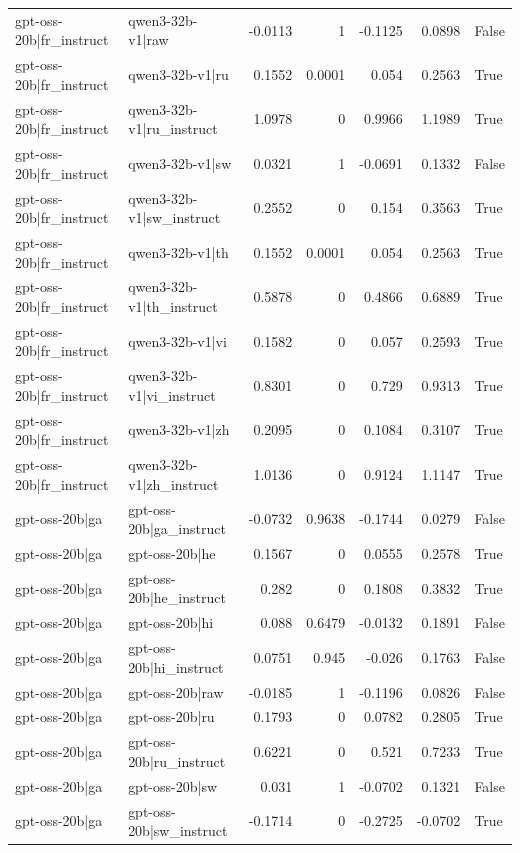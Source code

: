 \begin{table}
\begin{tabular}{l l r r r r l}
gpt-oss-20b|fr_instruct & qwen3-32b-v1|raw & -0.0113 & 1 & -0.1125 & 0.0898 & False \\
gpt-oss-20b|fr_instruct & qwen3-32b-v1|ru & 0.1552 & 0.0001 & 0.054 & 0.2563 & True \\
gpt-oss-20b|fr_instruct & qwen3-32b-v1|ru_instruct & 1.0978 & 0 & 0.9966 & 1.1989 & True \\
gpt-oss-20b|fr_instruct & qwen3-32b-v1|sw & 0.0321 & 1 & -0.0691 & 0.1332 & False \\
gpt-oss-20b|fr_instruct & qwen3-32b-v1|sw_instruct & 0.2552 & 0 & 0.154 & 0.3563 & True \\
gpt-oss-20b|fr_instruct & qwen3-32b-v1|th & 0.1552 & 0.0001 & 0.054 & 0.2563 & True \\
gpt-oss-20b|fr_instruct & qwen3-32b-v1|th_instruct & 0.5878 & 0 & 0.4866 & 0.6889 & True \\
gpt-oss-20b|fr_instruct & qwen3-32b-v1|vi & 0.1582 & 0 & 0.057 & 0.2593 & True \\
gpt-oss-20b|fr_instruct & qwen3-32b-v1|vi_instruct & 0.8301 & 0 & 0.729 & 0.9313 & True \\
gpt-oss-20b|fr_instruct & qwen3-32b-v1|zh & 0.2095 & 0 & 0.1084 & 0.3107 & True \\
gpt-oss-20b|fr_instruct & qwen3-32b-v1|zh_instruct & 1.0136 & 0 & 0.9124 & 1.1147 & True \\
gpt-oss-20b|ga & gpt-oss-20b|ga_instruct & -0.0732 & 0.9638 & -0.1744 & 0.0279 & False \\
gpt-oss-20b|ga & gpt-oss-20b|he & 0.1567 & 0 & 0.0555 & 0.2578 & True \\
gpt-oss-20b|ga & gpt-oss-20b|he_instruct & 0.282 & 0 & 0.1808 & 0.3832 & True \\
gpt-oss-20b|ga & gpt-oss-20b|hi & 0.088 & 0.6479 & -0.0132 & 0.1891 & False \\
gpt-oss-20b|ga & gpt-oss-20b|hi_instruct & 0.0751 & 0.945 & -0.026 & 0.1763 & False \\
gpt-oss-20b|ga & gpt-oss-20b|raw & -0.0185 & 1 & -0.1196 & 0.0826 & False \\
gpt-oss-20b|ga & gpt-oss-20b|ru & 0.1793 & 0 & 0.0782 & 0.2805 & True \\
gpt-oss-20b|ga & gpt-oss-20b|ru_instruct & 0.6221 & 0 & 0.521 & 0.7233 & True \\
gpt-oss-20b|ga & gpt-oss-20b|sw & 0.031 & 1 & -0.0702 & 0.1321 & False \\
gpt-oss-20b|ga & gpt-oss-20b|sw_instruct & -0.1714 & 0 & -0.2725 & -0.0702 & True \\

\end{tabular}
\end{table}
